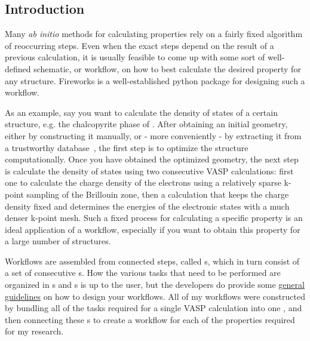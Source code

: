 \begin{refsection}
\pagebreak 
 
\section{Introduction} \label{automation:sec-intro} 
 
Many \textit{ab initio} methods for calculating properties rely on a fairly 
fixed algorithm of reoccurring steps. Even when the exact steps depend on the 
result of a previous calculation, it is usually feasible to come up with some 
sort of well-defined schematic, or workflow, on how to best calculate the 
desired property for any structure. Fireworks is a well-established python 
package for designing such a workflow. 
 
As an example, say you want to calculate the density of states of a certain 
structure, e.g. the chalcopyrite phase of . After obtaining an 
initial geometry, either by constructing it manually, or - more conveniently - 
by extracting it from a trustworthy database~\cite{Jain2013}, the first step 
is to optimize the structure computationally. Once you have obtained the 
optimized geometry, the next step is calculate the density of states using two 
consecutive VASP calculations: first one to calculate the charge 
density of the electrons using a relatively sparse k-point sampling of the 
Brillouin zone, then a calculation that keeps the charge density fixed and 
determines the energies of the electronic states with a much denser k-point 
mesh. Such a fixed process for calculating a specific property is an ideal 
application of a workflow, especially if you want to obtain this property for 
a large number of structures.  
 
Workflows are assembled from connected steps, called 
\href{https://github.com/materialsproject/fireworks/blob/master/fireworks/core/firework.py#L196}{}s, 
which in turn consist of a set of consecutive 
\href{https://github.com/materialsproject/fireworks/blob/master/fireworks/core/firework.py#L46}{}s. 
How the various tasks that need to be performed are organized in 
s and s is up to the user, but the developers do 
provide some 
\href{https://materialsproject.github.io/fireworks/design_tips.html}{general 
guidelines} on how to design your workflows. All of my workflows were 
constructed by bundling all of the tasks required for a single VASP 
calculation into one , and then connecting these 
s to create a workflow for each of the properties required for 
my research. 
 

\end{refsection}
